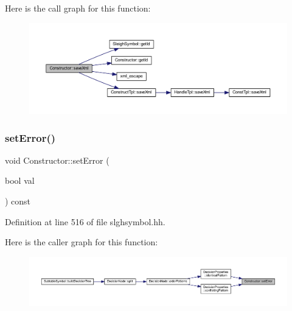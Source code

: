 Here is the call graph for this function\+:
\nopagebreak
\begin{figure}[H]
\begin{center}
\leavevmode
\includegraphics[width=350pt]{class_constructor_a13e55da521f225ca03ce3237b9879e71_cgraph}
\end{center}
\end{figure}
\mbox{\label{class_constructor_aac13e041cf5506a141771c3c0ddac45a}} 
\subsubsection{\texorpdfstring{setError()}{setError()}}
{\footnotesize\ttfamily void Constructor\+::set\+Error (\begin{DoxyParamCaption}\item[{bool}]{val }\end{DoxyParamCaption}) const\hspace{0.3cm}{\ttfamily [inline]}}



Definition at line 516 of file slghsymbol.\+hh.

Here is the caller graph for this function\+:
\nopagebreak
\begin{figure}[H]
\begin{center}
\leavevmode
\includegraphics[width=350pt]{class_constructor_aac13e041cf5506a141771c3c0ddac45a_icgraph}
\end{center}
\end{figure}
\mbox{\label{class_constructor_a62e79d4c17ff80718c9a7d8ad58f1c08}} 
